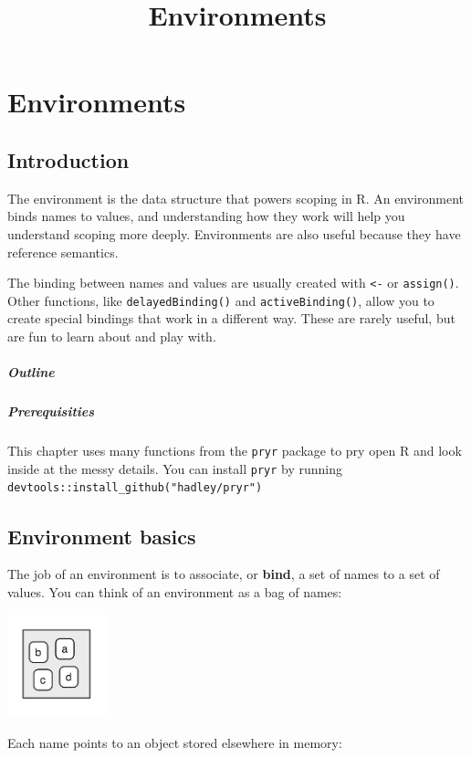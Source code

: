 \documentclass[oneside]{book}
\title{Environments}
\author{}
\date{}
\newenvironment{Shaded}{}{}
\newcommand{\KeywordTok} [1]{\textcolor[rgb]{0.00,0.44,0.13}{{#1}}}
\newcommand{\DecValTok}  [1]{\textcolor[rgb]{0.25,0.63,0.44}{{#1}}}
\newcommand{\FloatTok}   [1]{\textcolor[rgb]{0.25,0.63,0.44}{{#1}}}
\newcommand{\StringTok}  [1]{\textcolor[rgb]{0.25,0.44,0.63}{{#1}}}
\newcommand{\OtherTok}   [1]{\textcolor[rgb]{0.00,0.44,0.13}{{#1}}}
\newcommand{\NormalTok}  [1]{{#1}}
\begin{document}
\section{Environments}\label{environments}

\subsection{Introduction}\label{introduction}

The environment is the data structure that powers scoping in R. An
environment binds names to values, and understanding how they work will
help you understand scoping more deeply. Environments are also useful
because they have reference semantics.

The binding between names and values are usually created with
\texttt{\textless{}-} or \texttt{assign()}. Other functions, like
\texttt{delayedBinding()} and \texttt{activeBinding()}, allow you to
create special bindings that work in a different way. These are rarely
useful, but are fun to learn about and play with.

\subparagraph{Outline}\label{outline}

\subparagraph{Prerequisities}\label{prerequisities}

This chapter uses many functions from the \texttt{pryr} package to pry
open R and look inside at the messy details. You can install
\texttt{pryr} by running
\texttt{devtools::install\_github("hadley/pryr")}

\subsection{Environment basics}\label{environment-basics}

The job of an environment is to associate, or \textbf{bind}, a set of
names to a set of values. You can think of an environment as a bag of
names:

\includegraphics[width=1.18in,height=1.18in]{diagrams/environments.png/bag-of-names.png}

Each name points to an object stored elsewhere in memory:

\begin{Shaded}
\end{Shaded}
\end{document}
